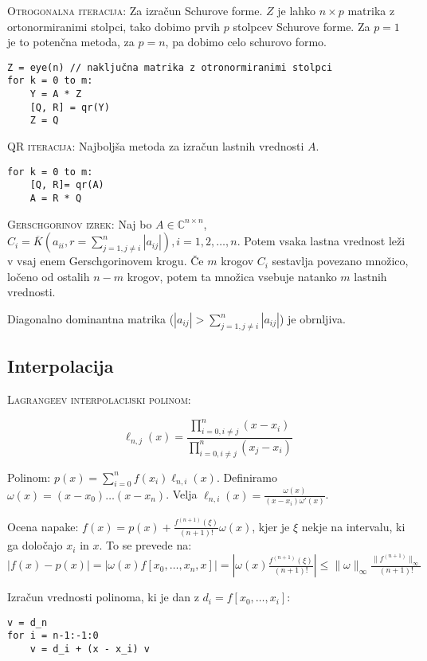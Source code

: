 \documentclass[a4paper,10pt]{article}
\theoremstyle{definition}
\def\C{\mathbb{C}}
\begin{document}
\textsc{Otrogonalna iteracija:} Za izračun Schurove forme. $Z$ je lahko $n\times
p$ matrika z ortonormiranimi stolpci, tako dobimo prvih $p$ stolpcev Schurove
forme. Za $p = 1$ je to potenčna metoda, za $p = n$, pa dobimo celo schurovo
formo.
\scriptsize
\begin{verbatim}
Z = eye(n) // naključna matrika z otronormiranimi stolpci
for k = 0 to m:
    Y = A * Z
    [Q, R] = qr(Y)
    Z = Q
\end{verbatim}
\normalsize

\textsc{QR iteracija:} Najboljša metoda za izračun lastnih vrednosti $A$.
\scriptsize
\begin{verbatim}
for k = 0 to m:
    [Q, R]= qr(A)
    A = R * Q
\end{verbatim}
\normalsize

\textsc{Gerschgorinov izrek:} Naj bo $A \in \C ^{n\times n}$, $C_i =
\overline{K}(a_{ii}, r=\sum_{j=1, j \neq i}^n | a_{ij}|), i=1,2,\ldots ,n$.
Potem vsaka lastna vrednost leži v vsaj enem Gerschgorinovem krogu. Če $m$
krogov $C_i$ sestavlja povezano množico, ločeno od ostalih $n-m$ krogov, potem
ta množica vsebuje natanko $m$ lastnih vrednosti.

Diagonalno dominantna matrika ($|a_{ij}| > \sum_{j=1, j\neq i}^n|a_{ij}|$) je obrnljiva.

\subsection*{Interpolacija}

\textsc{Lagrangeev interpolacijski polinom:}

\[ \ell_{n,j}(x)=\frac{\prod_{i=0,i\neq j}^n(x-x_i)}{\prod_{i=0,i\neq
j}^n(x_j-x_i)} \]

Polinom: $p(x) = \sum_{i=0}^nf(x_i)\ell_{n,i}(x)$. Definiramo $\omega(x) =
(x-x_0)\dots(x-x_n)$. Velja $\ell_{n,i}(x) = \frac{\omega(x)}{(x-x_i)\omega'(x)}$.

Ocena napake: $f(x) = p(x) + \frac{f^{(n+1)}(\xi)}{(n+1)!}\omega(x)$, kjer je
$\xi$ nekje na intervalu, ki ga določajo $x_i$ in $x$. To se prevede na:
$|f(x) - p(x)|  = |\omega(x) f[x_0, \ldots, x_n, x]| =
|\omega(x) \frac{f^{(n+1)}(\xi)}{(n+1)!}| \leq \|\omega\|_\infty
\frac{\|f^{(n+1)}\|_\infty}{(n+1)!}$


Izračun vrednosti polinoma, ki je dan z $d_i = f[x_0, \ldots, x_i]$:
\scriptsize
\begin{verbatim}
v = d_n
for i = n-1:-1:0
    v = d_i + (x - x_i) v
\end{verbatim}
\normalsize
\end{document}

